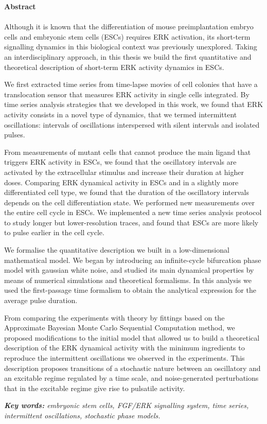 \documentclass[./main.tex]{subfiles}
\begin{document}
{\noindent\large\textbf{Abstract}} \\ \\ 
Although it is known that the differentiation of mouse preimplantation embryo cells and embryonic stem cells (ESCs) requires ERK activation, its short-term signalling dynamics in this biological context was previously unexplored. Taking an interdisciplinary approach, in this thesis we build the first quantitative and theoretical description of short-term ERK activity dynamics in ESCs. 


We first extracted time series from time-lapse movies of cell colonies that have a translocation sensor that measures ERK activity in single cells integrated. By time series analysis strategies that we developed in this work, we found that ERK activity consists in a novel type of dynamics, that we termed intermittent oscillations: intervals of oscillations interspersed with silent intervals and isolated pulses.

From measurements of mutant cells that cannot produce the main ligand that triggers ERK activity in ESCs, we found that the oscillatory intervals are activated by the extracellular stimulus and increase their duration at higher doses. Comparing ERK dynamical activity in ESCs and in a slightly more differentiated cell type, we found that the duration of the oscillatory intervals depends on the cell differentiation state. We performed new measurements over the entire cell cycle in ESCs. We implemented a new time series analysis protocol to study longer but lower-resolution traces, and found that ESCs are more likely to pulse earlier in the cell cycle.


We formalise the quantitative description we built in a low-dimensional mathematical model. We began by introducing an infinite-cycle bifurcation phase model with gaussian white noise, and studied its main dynamical properties by means of numerical simulations and theoretical formalisms. In this analysis we used the first-passage time formalism to obtain the analytical expression for the average pulse duration.

From comparing the experiments with theory by fittings based on the Approximate Bayesian Monte Carlo Sequential Computation method, we proposed modifications to the initial model that allowed us to build a theoretical description of the ERK dynamical activity with the minimum ingredients to reproduce the intermittent oscillations we observed in the experiments. This description proposes transitions of a stochastic nature between an oscillatory and an excitable regime regulated by a time scale, and noise-generated perturbations that in the excitable regime give rise to pulsatile activity.

\vspace{0.5cm}


\textit{\textbf{Key words:} embryonic stem cells, FGF/ERK signalling system, time series, intermittent oscillations, stochastic phase models.}
\end{document}
